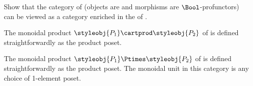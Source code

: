 \begin{gradedexercise}
    \label{ex:DPIsEnrichedInPos}
    Show that the category of  (objects are  and morphisms are $\Bool$-profunctors) can be viewed as a category enriched in the  of .



    The monoidal product $\styleobj{P_1} \cartprod \styleobj{P_2}$ of  is defined straightforwardly as the product poset.



    The monoidal product $\styleobj{P_1} \Ptimes \styleobj{P_2}$ of  is defined straightforwardly as the product poset.
    The monoidal unit in this category is any choice of 1-element poset.
\end{gradedexercise}

